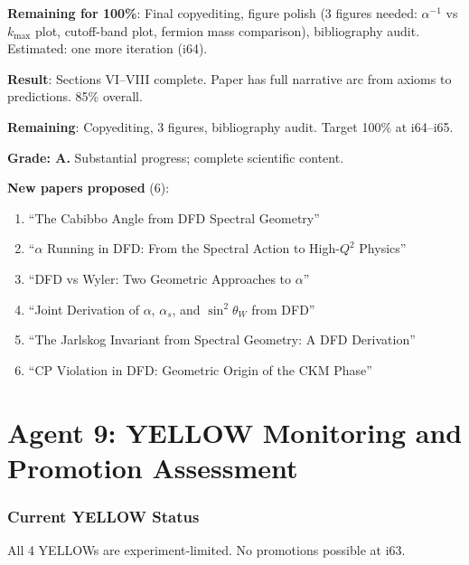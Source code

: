 \documentclass[11pt,a4paper]{article}
\begin{document}
\textbf{Remaining for 100\%}: Final copyediting, figure polish (3 figures needed: $\alpha^{-1}$ vs $k_{\max}$ plot, cutoff-band plot, fermion mass comparison), bibliography audit. Estimated: one more iteration (i64).

\begin{tcolorbox}[colback=green!5!white, colframe=green!60!black, title={Agent 8: $\alpha$ Paper at 85\%}]
\textbf{Result}: Sections VI--VIII complete. Paper has full narrative arc from axioms to predictions. 85\% overall.

\textbf{Remaining}: Copyediting, 3 figures, bibliography audit. Target 100\% at i64--i65.

\textbf{Grade: A.} Substantial progress; complete scientific content.

\textbf{New papers proposed} (6):
\begin{enumerate}
\item ``The Cabibbo Angle from DFD Spectral Geometry''
\item ``$\alpha$ Running in DFD: From the Spectral Action to High-$Q^2$ Physics''
\item ``DFD vs Wyler: Two Geometric Approaches to $\alpha$''
\item ``Joint Derivation of $\alpha$, $\alpha_s$, and $\sin^2\theta_W$ from DFD''
\item ``The Jarlskog Invariant from Spectral Geometry: A DFD Derivation''
\item ``CP Violation in DFD: Geometric Origin of the CKM Phase''
\end{enumerate}
\end{tcolorbox}


\part{Agent 9: YELLOW Monitoring and Promotion Assessment}
\label{part:yellow}

\section{Current YELLOW Status}

All 4 YELLOWs are experiment-limited. No promotions possible at i63.
\end{document}
